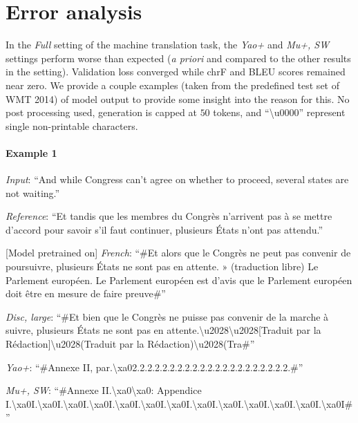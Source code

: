 \section{Error analysis}
\unskip\label{sec:error-analysis}
In the \emph{Full} setting of the machine translation task, the \emph{Yao+} and \emph{Mu+, SW} settings perform worse than expected (\emph{a priori} and compared to the other results in the setting).
Validation loss converged while chrF and BLEU scores remained near zero.
We provide a couple examples (taken from the predefined test set of WMT 2014) of model output to provide some insight into the reason for this.
No post processing used, generation is capped at $50$ tokens, and ``\textbackslash{}u0000'' represent single non-printable characters.

\paragraph{Example 1}
\emph{Input}: ``And while Congress can't agree on whether to proceed, several states are not waiting.''

\emph{Reference}: ``Et tandis que les membres du Congrès n'arrivent pas à se mettre d'accord pour savoir s'il faut continuer, plusieurs États n'ont pas attendu.''

[Model pretrained on] \emph{French}:
``\#Et alors que le Congrès ne peut pas convenir de poursuivre, plusieurs États ne sont pas en attente. » (traduction libre) Le Parlement européen. Le Parlement européen est d’avis que le Parlement européen doit être en mesure de faire preuve\#''

\emph{Disc, large}:
``\#Et bien que le Congrès ne puisse pas convenir de la marche à suivre, plusieurs États ne sont pas en attente.\textbackslash{}u2028\textbackslash{}u2028[Traduit par la Rédaction]\textbackslash{}u2028(Traduit par la Rédaction)\textbackslash{}u2028(Tra\#''

\emph{Yao+}:
``\#Annexe II, par.\allowbreak{}\textbackslash{}xa02.\allowbreak{}2.\allowbreak{}2.\allowbreak{}2.\allowbreak{}2.\allowbreak{}2.\allowbreak{}2.\allowbreak{}2.\allowbreak{}2.\allowbreak{}2.\allowbreak{}2.\allowbreak{}2.\allowbreak{}2.\allowbreak{}2.\allowbreak{}2.\allowbreak{}2.\allowbreak{}2.\allowbreak{}2.\allowbreak{}2.\allowbreak{}2.\allowbreak{}2.\allowbreak{}\#''

\emph{Mu+, SW}:
``\#Annexe II.\allowbreak{}\textbackslash{}xa0\allowbreak{}\textbackslash{}xa0: Appendice I.\allowbreak{}\textbackslash{}xa0I.\allowbreak{}\textbackslash{}xa0I.\allowbreak{}\textbackslash{}xa0I.\allowbreak{}\textbackslash{}xa0I.\allowbreak{}\textbackslash{}xa0I.\allowbreak{}\textbackslash{}xa0I.\allowbreak{}\textbackslash{}xa0I.\allowbreak{}\textbackslash{}xa0I.\allowbreak{}\textbackslash{}xa0I.\allowbreak{}\textbackslash{}xa0I.\allowbreak{}\textbackslash{}xa0I.\allowbreak{}\textbackslash{}xa0I.\allowbreak{}\textbackslash{}xa0I\#''

